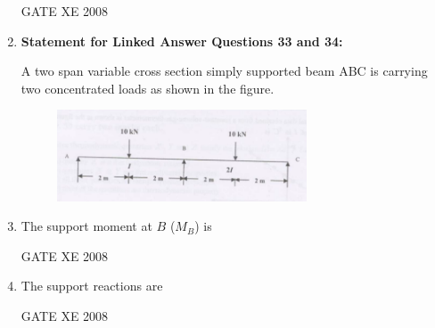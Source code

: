 \documentclass[12pt]{article}
\begin{document}
\begin{enumerate}[label=Q\arabic*.]
GATE XE 2008

\item[] \textbf{Statement for Linked Answer Questions 33 and 34:}  

A two span variable cross section simply supported beam ABC is carrying two concentrated loads as shown in the figure.

    \begin{figure}[H]
    \centering
    \includegraphics[width=0.7\textwidth]{figs/ass1_f_q33.png}
    \caption{}
    \end{figure}

\item The support moment at $B$ ($M_B$) is  

\begin{enumerate}[label=(\Alph*)]
\end{enumerate}

GATE XE 2008


\item The support reactions are  

\begin{enumerate}[label=(\Alph*)]
\end{enumerate}

GATE XE 2008


\end{enumerate}
\end{document}
